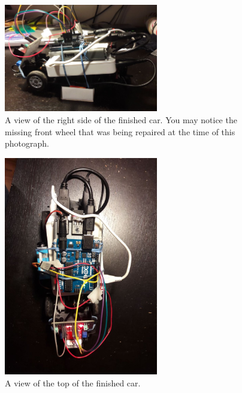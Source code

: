 \begin{figure}[H]
\centering
  \includegraphics[width=0.6\textwidth]{sections/testRes/right}
    \caption{A view of the right side of the finished car. You may notice the missing front wheel that was being repaired at the time of this photograph.}
\end{figure}
\begin{figure}[H]
\centering
  \includegraphics[width=0.6\textwidth]{sections/testRes/top}
    \caption{A view of the top of the finished car.}
\end{figure}
